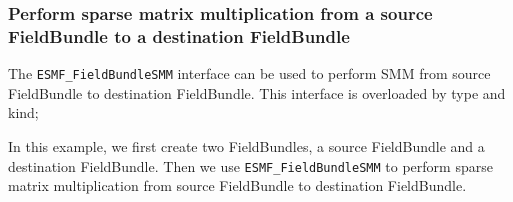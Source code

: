  
\setlength{\oldparskip}{\parskip}
\setlength{\parskip}{1.5ex}
\setlength{\oldparindent}{\parindent}
\setlength{\parindent}{0pt}
\setlength{\oldbaselineskip}{\baselineskip}
\setlength{\baselineskip}{11pt}
 
\def\bv{\begin{verbatim}}
\def\ev{\end{verbatim}}
\def\be{\begin{equation}}
\def\ee{\end{equation}}
\def\bea{\begin{eqnarray}}
\def\eea{\end{eqnarray}}
\def\bi{\begin{itemize}}
\def\ei{\end{itemize}}
\def\bn{\begin{enumerate}}
\def\en{\end{enumerate}}
\def\bd{\begin{description}}
\def\ed{\end{description}}
\def\({\left (}
\def\){\right )}
\def\[{\left [}
\def\]{\right ]}
\def\<{\left  \langle}
\def\>{\right \rangle}
\def\cI{{\cal I}}
\def\diag{\mathop{\rm diag}}
\def\tr{\mathop{\rm tr}}


 

   \subsubsection{Perform sparse matrix multiplication from a source FieldBundle 
    to a destination FieldBundle}
   \label{sec:fieldbundle:usage:smm_1dptr}
  
   The {\tt ESMF\_FieldBundleSMM} interface can be used to perform SMM from
   source FieldBundle to destination FieldBundle. This interface is overloaded by type and kind;
   
   In this example, we first create two FieldBundles, a source FieldBundle and a destination
   FieldBundle. Then we use {\tt ESMF\_FieldBundleSMM} to
   perform sparse matrix multiplication from source FieldBundle to destination FieldBundle.
  
